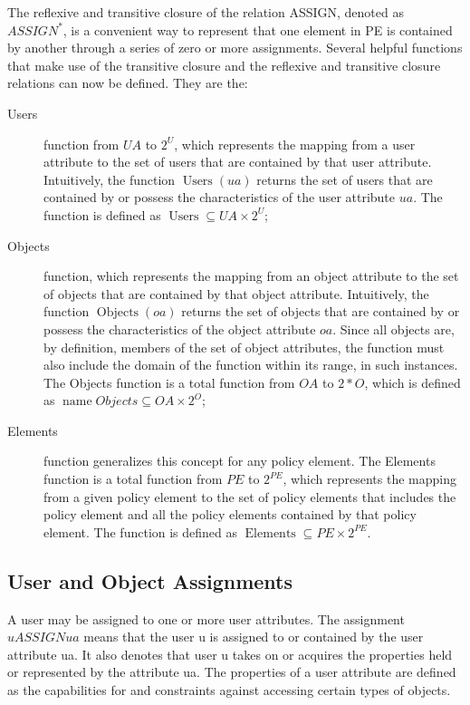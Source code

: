 \documentclass[12pt,a4paper,titlepage]{book}
\begin{document}
	The reflexive and transitive closure of the relation ASSIGN, denoted as $ASSIGN^*$, is a convenient way to represent that one element in PE is contained by another through a 	series of zero or more assignments. Several helpful functions that make use of the transitive closure and the reflexive and transitive closure relations can now be defined. They are the:
	
	\begin{description}
		
		\item[Users] function from $ UA $ to $ 2^U $, which represents the mapping from a user attribute to the set of users that are contained by that user attribute. Intuitively, the function $ \operatorname{Users}(ua) $ returns the set of users that are contained by or possess the characteristics of the user attribute $ ua $. The function is defined as $ \operatorname{Users} \subseteq UA \times 2^U $;
		
		\item[Objects] function, which represents the mapping from an object attribute to the set of objects that are contained by that object attribute. Intuitively, the function $ \operatorname{Objects}(oa) $ returns the set of objects that are contained by or possess the characteristics of the object attribute $ oa $. Since all objects are, by definition, members of the set of object attributes, the function must also include the domain of the function within its range, in such instances. The Objects function is a total function from $ OA $ to $ 2*O $, which is defined as $ \operatorname{name}Objects \subseteq OA \times 2^O $;
		
		\item[Elements] function generalizes this concept for any policy element. The Elements function is a total function from $ PE $ to $ 2^{PE} $, which represents the mapping from a given policy element to the set of policy elements that includes the policy element and all the policy elements contained by that policy element. The function is defined as $ \operatorname{Elements} \subseteq PE \times 2^{PE} $.
		
	\end{description}
	
	\subsection{User and Object Assignments}
	
		A user may be assigned to one or more user attributes. The assignment $ u ASSIGN ua $ means that the user u is assigned to or contained by the user attribute ua. It also denotes that user u takes on or acquires the properties held or represented by the attribute ua. The properties of a user attribute are defined as the capabilities for and constraints against accessing certain types of objects.
		
\end{document}
